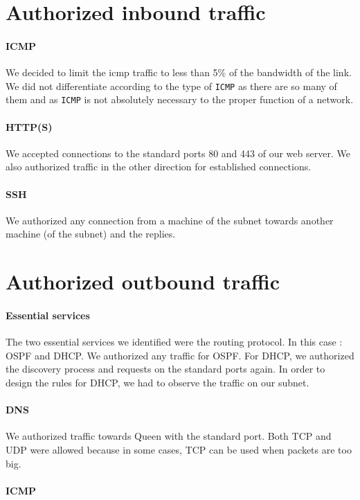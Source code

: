 \documentclass[a4paper,titlepage]{article}
\begin{document}
\section{Authorized inbound traffic}
\paragraph{ICMP} We decided to limit the icmp traffic to less than 5\% of the bandwidth of the link. We did not differentiate according to the type of \texttt{ICMP} as there are so many of them and as \texttt{ICMP} is not absolutely necessary to the proper function of a network.

\paragraph{HTTP(S)} We accepted connections to the standard ports 80 and 443 of our web server. We also authorized traffic in the other direction for established connections.

\paragraph{SSH} We authorized any connection from a machine of the subnet towards another machine (of the subnet) and the replies.

\section{Authorized outbound traffic}
\paragraph{Essential services} The two essential services we identified were the routing protocol. In this case : OSPF and DHCP. We authorized any traffic for OSPF. For DHCP, we authorized the discovery process and requests on the standard ports again. In order to design the rules for DHCP, we had to observe the traffic on our subnet.

\paragraph{DNS} We authorized traffic towards Queen with the standard port. Both TCP and UDP were allowed because in some cases, TCP can be used when packets are too big.

\paragraph{ICMP}
\end{document}

